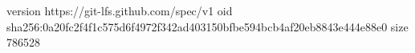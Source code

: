 version https://git-lfs.github.com/spec/v1
oid sha256:0a20fc2f4f1c575d6f4972f342ad403150bfbe594bcb4af20eb8843e444e88e0
size 786528
